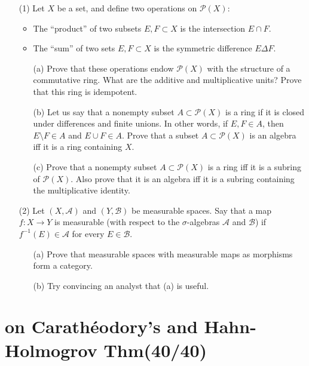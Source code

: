\documentclass[lang=cn,11pt]{elegantbook}
\begin{document}
\begin{itemize}
    \item[(1)] Let $X$ be a set, and define two operations on $\mathcal{P}(X)$:
    \begin{itemize}
        \item The “product” of two subsets $E, F \subset X$ is the intersection $E \cap F$.
        \item The “sum” of two sets $E, F \subset X$ is the symmetric difference $E \Delta F$.
    \end{itemize}
    \begin{itemize}
        \item[(a)] Prove that these operations endow $\mathcal{P}(X)$ with the structure of a commutative ring. What are the additive and multiplicative units? Prove that this ring is idempotent.
        \item[(b)] Let us say that a nonempty subset $A \subset \mathcal{P}(X)$ is a ring if it is closed under differences and finite unions. In other words, if $E, F \in A$, then $E \setminus F \in A$ and $E \cup F \in A$. Prove that a subset $A \subset \mathcal{P}(X)$ is an algebra iff it is a ring containing $X$.
        \item[(c)] Prove that a nonempty subset $A \subset \mathcal{P}(X)$ is a ring iff it is a subring of $\mathcal{P}(X)$. Also prove that it is an algebra iff it is a subring containing the multiplicative identity.
    \end{itemize}
    \item[(2)] Let $(X, \mathcal{A})$ and $(Y, \mathcal{B})$ be measurable spaces. Say that a map $f : X \to Y$ is measurable (with respect to the $\sigma$-algebras $\mathcal{A}$ and $\mathcal{B}$) if $f^{-1}(E) \in \mathcal{A}$ for every $E \in \mathcal{B}$.
    \begin{itemize}
        \item[(a)] Prove that measurable spaces with measurable maps as morphisms form a category.
        \item[(b)] Try convincing an analyst that (a) is useful.
    \end{itemize}
\end{itemize}





\chapter{on Carathéodory's and Hahn-Holmogrov Thm(40/40)}
\end{document}
